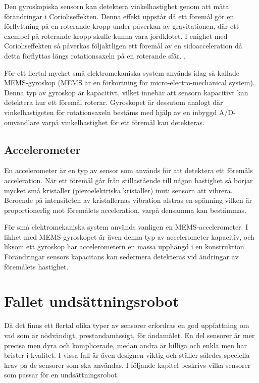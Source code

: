 \documentclass[11pt]{article}
\begin{document}
\begin{flushleft}
Den gyroskopiska sensorn kan detektera vinkelhastighet genom att mäta förändringar i Corioliseffekten. Denna effekt uppstår då ett föremål gör en förflyttning på en roterande kropp under påverkan av gravitationen, där ett exempel på roterande kropp skulle kunna vara jordklotet. I enighet med Corioliseffekten så påverkas följaktligen ett föremål av en sidoacceleration då detta förflyttas längs rotationsaxeln på en roterande sfär. \cite{Coriolis}, \cite{MEMS_gyro}

För ett flertal mycket små elektromekaniska system används idag så kallade MEMS-gyroskop (MEMS är en förkortning för micro-electro-mechanical system). Denna typ av gyroskop är kapacitivt, vilket innebär att sensorn kapacitivt kan detektera hur ett föremål roterar. Gyroskopet är dessutom analogt där vinkelhastigeten för rotationsaxeln bestäms med hjälp av en inbyggd A/D-omvandlare varpå vinkelhastighet för ett föremål kan detekteras. \cite{MEMS_gyro}

\subsection{Accelerometer}
En accelerometer är en typ av sensor som används för att detektera ett föremåls acceleration. När ett föremål går från stillastående till någon hastighet så börjar mycket små kristaller (piezoelektriska kristaller) inuti sensorn att vibrera. Beroende på intensiteten av kristallernas vibration alstras en spänning vilken är proportionerlig mot föremålets acceleration, varpå densamma kan bestämmas. \cite{Accelerometer}

För små elektromekaniska system används vanligen en MEMS-accelerometer. I likhet med MEMS-gyroskopet är även denna typ av accelerometer kapacitiv, och liksom ett gyroskop har accelerometern en massa upphängd i en konstruktion. Förändringar sensors kapacitans kan sedermera detekteras vid ändringar av föremålets hastighet. \cite{MEMS_acc}





\pagebreak
\section{Fallet undsättningsrobot}
Då det finns ett flertal olika typer av sensorer erfordras en god uppfattning om vad som är nödvändigt, prestandamässigt, för ändamålet. En del sensorer är mer precisa men dyra och komplicerade, medan andra är billiga och enkla men har brister i kvalitet. I vissa fall är även designen viktig och ställer således speciella krav på de sensorer som ska användas. I följande kapitel beskrivs vilka sensorer som passar för en undsättningsrobot. 


\end{flushleft}
\end{document}

